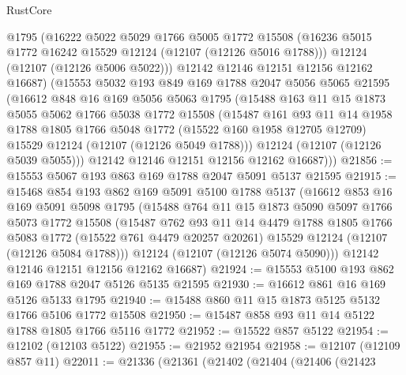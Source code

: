 \begin{lexlean}{RustCore}
\begin{coremodule}
        @1795
        (@16222
          @5022
          @5029
          @1766
          @5005
          @1772
          @15508
          (@16236 @5015 @1772 @16242 @15529 @12124 (@12107 (@12126 @5016 @1788)))
          @12124
          (@12107 (@12126 @5006 @5022)))
        @12142
        @12146
        @12151
        @12156
        @12162
        @16687)
      (@15553
        @5032
        @193
        @849
        @169
        @1788
        @2047
        @5056
        @5065
        @21595
        (@16612
          @848
          @16
          @169
          @5056
          @5063
          @1795
          (@15488
            @163
            @11
            @15
            @1873
            @5055
            @5062
            @1766
            @5038
            @1772
            @15508
            (@15487
              @161
              @93
              @11
              @14
              @1958
              @1788
              @1805
              @1766
              @5048
              @1772
              (@15522 @160 @1958 @12705 @12709)
              @15529
              @12124
              (@12107 (@12126 @5049 @1788)))
            @12124
            (@12107 (@12126 @5039 @5055)))
          @12142
          @12146
          @12151
          @12156
          @12162
          @16687)))
@21856 := @15553 @5067 @193 @863 @169 @1788 @2047 @5091 @5137 @21595
@21915 := @15468
    @854
    @193
    @862
    @169
    @5091
    @5100
    @1788
    @5137
    (@16612
      @853
      @16
      @169
      @5091
      @5098
      @1795
      (@15488
        @764
        @11
        @15
        @1873
        @5090
        @5097
        @1766
        @5073
        @1772
        @15508
        (@15487
          @762
          @93
          @11
          @14
          @4479
          @1788
          @1805
          @1766
          @5083
          @1772
          (@15522 @761 @4479 @20257 @20261)
          @15529
          @12124
          (@12107 (@12126 @5084 @1788)))
        @12124
        (@12107 (@12126 @5074 @5090)))
      @12142
      @12146
      @12151
      @12156
      @12162
      @16687)
@21924 := @15553 @5100 @193 @862 @169 @1788 @2047 @5126 @5135 @21595
@21930 := @16612 @861 @16 @169 @5126 @5133 @1795
@21940 := @15488 @860 @11 @15 @1873 @5125 @5132 @1766 @5106 @1772 @15508
@21950 := @15487 @858 @93 @11 @14 @5122 @1788 @1805 @1766 @5116 @1772
@21952 := @15522 @857 @5122
@21954 := @12102 (@12103 @5122)
@21955 := @21952 @21954
@21958 := @12107 (@12109 @857 @11)
@22011 := @21336
    (@21361
      (@21402
        (@21404
          (@21406
            (@21423

\end{coremodule}
\end{lexlean}
